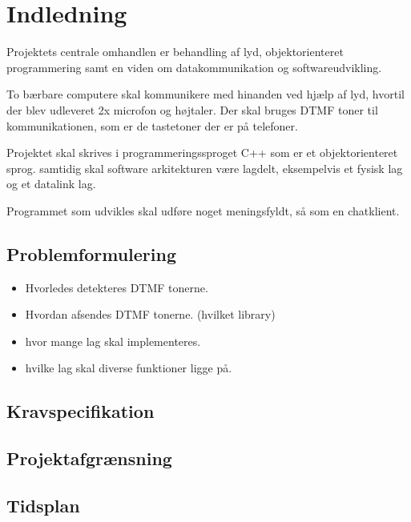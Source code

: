\section{Indledning}
Projektets centrale omhandlen er behandling af lyd, objektorienteret programmering samt en viden om datakommunikation og softwareudvikling.

To bærbare computere skal kommunikere med hinanden ved hjælp af lyd, hvortil der blev udleveret 2x microfon og højtaler.
Der skal bruges DTMF toner til kommunikationen, som er de tastetoner der er på telefoner.

Projektet skal skrives i programmeringssproget C++ som er et objektorienteret sprog.
samtidig skal software arkitekturen være lagdelt, eksempelvis et fysisk lag og et datalink lag.

Programmet som udvikles skal udføre noget meningsfyldt, så som en chatklient.
\subsection{Problemformulering}

\begin{itemize}[noitemsep]
	\item Hvorledes detekteres DTMF tonerne.
	\item Hvordan afsendes DTMF tonerne. (hvilket library)
	\item hvor mange lag skal implementeres.
	\item hvilke lag skal diverse funktioner ligge på.
\end{itemize}

\subsection{Kravspecifikation}
\subsection{Projektafgrænsning}
\subsection{Tidsplan}